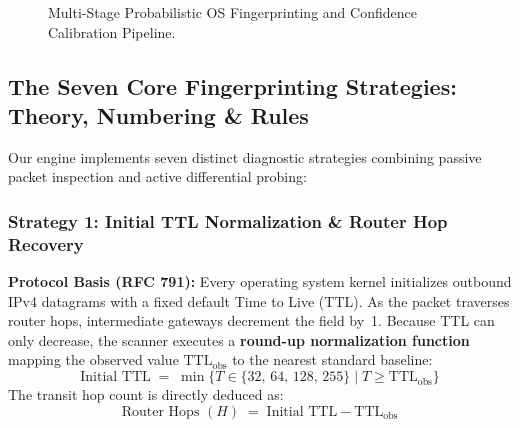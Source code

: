 \begin{figure}[htbp]
{%
}
\caption{Multi-Stage Probabilistic OS Fingerprinting and Confidence Calibration Pipeline.}
\label{fig:fp_pipeline}
\end{figure}

\subsection{The Seven Core Fingerprinting Strategies: Theory, Numbering \& Rules}
Our engine implements seven distinct diagnostic strategies combining passive packet inspection and
active differential probing:

\subsubsection{Strategy 1: Initial TTL Normalization \& Router Hop Recovery}
\textbf{Protocol Basis (RFC 791):} Every operating system kernel initializes outbound IPv4 datagrams
with a fixed default Time to Live (TTL). As the packet traverses router hops, intermediate gateways
decrement the field by~1. Because TTL can only decrease, the scanner executes a \textbf{round-up
normalization function} mapping the observed value $\text{TTL}_{\text{obs}}$ to the nearest standard baseline:
\begin{equation}
\text{Initial TTL} \;=\; \min \{ T \in \{32, \, 64, \, 128, \, 255\} \mid T \ge \text{TTL}_{\text{obs}} \}
\end{equation}
The transit hop count is directly deduced as:
\begin{equation}
\text{Router Hops } (H) \;=\; \text{Initial TTL} - \text{TTL}_{\text{obs}}
\end{equation}

